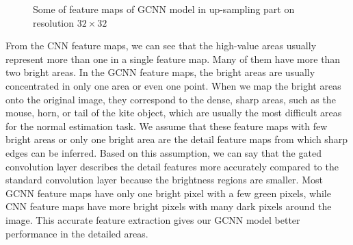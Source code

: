 \begin{figure}[H]
\begin{minipage}{0.32\linewidth}
		\end{minipage}
	
		\decoRule
		\caption{Some of feature maps of GCNN model in up-sampling part on resolution $ 32\times32 $}
		\label{fig:global-feature-maps}
\end{figure}





From the CNN feature maps, we can see that the high-value areas usually represent more than one in a single feature map. Many of them have more than two bright areas. 
In the GCNN feature maps, the bright areas are usually concentrated in only one area or even one point. When we map the bright areas onto the original image, they correspond to the dense, sharp areas, such as the mouse, horn, or tail of the kite object, which are usually the most difficult areas for the normal estimation task. We assume that these feature maps with few bright areas or only one bright area are the detail feature maps from which sharp edges can be inferred. Based on this assumption, we can say that the gated convolution layer describes the detail features more accurately compared to the standard convolution layer because the brightness regions are smaller. Most GCNN feature maps have only one bright pixel with a few green pixels, while CNN feature maps have more bright pixels with many dark pixels around the image. This accurate feature extraction gives our GCNN model better performance in the detailed areas.

